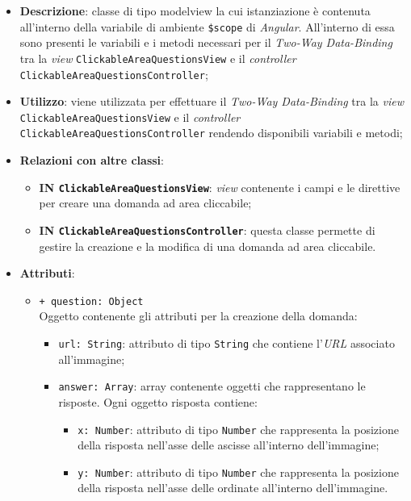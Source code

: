\begin{itemize}
	\item \textbf{Descrizione}: classe di tipo modelview la cui istanziazione è contenuta all'interno della variabile di ambiente \texttt{\$scope} di \textit{Angular}. All'interno di essa sono presenti le variabili e i metodi necessari per il \textit{Two-Way Data-Binding} tra la \textit{view} \texttt{ClickableAreaQuestionsView} e il \textit{controller} \texttt{ClickableAreaQuestionsController}; 
	\item \textbf{Utilizzo}: viene utilizzata per effettuare il \textit{Two-Way Data-Binding} tra la \textit{view}\\ \texttt{ClickableAreaQuestionsView} e il \textit{controller} \texttt{ClickableAreaQuestionsController} rendendo disponibili variabili e metodi;
	\item \textbf{Relazioni con altre classi}:
	\begin{itemize}
		\item \textbf{IN \texttt{ClickableAreaQuestionsView}}: \textit{view} contenente i campi e le direttive per creare una domanda ad area cliccabile; 
		\item \textbf{IN \texttt{ClickableAreaQuestionsController}}: questa classe permette di gestire la creazione e la modifica di una domanda ad area cliccabile.
	\end{itemize}
	\item \textbf{Attributi}:
	\begin{itemize}
			\item \texttt{+ question: Object} \\ Oggetto contenente gli attributi per la creazione della domanda:
			\begin{itemize}
				\item \texttt{url: String}: attributo di tipo \texttt{String} che contiene l'\textit{URL} associato all'immagine;
				\item \texttt{answer: Array}: array contenente oggetti che rappresentano le risposte. Ogni oggetto risposta contiene:
				\begin{itemize}
					\item \texttt{x: Number}: attributo di tipo \texttt{Number} che rappresenta la posizione della risposta nell'asse delle ascisse all'interno dell'immagine;
					\item \texttt{y: Number}: attributo di tipo \texttt{Number} che rappresenta la posizione della risposta nell'asse delle ordinate all'interno dell'immagine.

\end{itemize}
\end{itemize}
\end{itemize}
\end{itemize}
